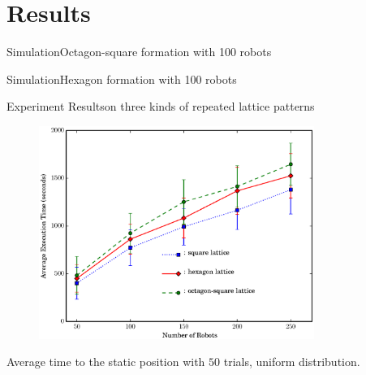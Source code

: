 \documentclass[10pt]{beamer}
\begin{document}
\section{Results}
\begin{frame}{Simulation}{Octagon-square formation with 100 robots}
  \begin{center}
  \end{center}
\end{frame}
\begin{frame}{Simulation}{Hexagon formation with 100 robots}
  \begin{center}
  \end{center}
\end{frame}
\begin{frame}{Experiment Results}{on three kinds of repeated
lattice patterns}
\begin{figure}
  \centering
  \includegraphics[width=0.8\textwidth]{figs/exptime}
\end{figure}
\begin{center}
  \footnotesize{Average time to the static position with $50$ trials, uniform distribution.}
\end{center}
\end{frame}
\end{document}
